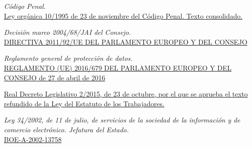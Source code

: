 \documentclass[10pt,a4paper]{article}
\begin{document}
\newpage

\begin{thebibliography}{9}
  \textit{Código Penal.}\\
  \href{https://www.boe.es/buscar/pdf/1995/BOE-A-1995-25444-consolidado.pdf}{Ley orgánica 10/1995 de 23 de noviembre del Código Penal. Texto consolidado.}

\textit{Decisión marco 2004/68/JAI del Consejo.}\\
\href{https://www.boe.es/doue/2011/335/L00001-00014.pdf}{DIRECTIVA 2011/92/UE DEL PARLAMENTO EUROPEO Y DEL CONSEJO}

\textit{Reglamento general de protección de datos.}\\
\href{https://www.boe.es/doue/2016/119/L00001-00088.pdf}{REGLAMENTO (UE) 2016/679 DEL PARLAMENTO EUROPEO Y DEL CONSEJO de 27 de abril de 2016}

\href{https://www.boe.es/eli/es/rdlg/2015/10/23/2/con}{Real Decreto Legislativo 2/2015, de 23 de octubre, por el que se aprueba el texto refundido de la Ley del Estatuto de los Trabajadores.}

\textit{Ley 34/2002, de 11 de julio, de servicios de la sociedad de la información y de comercio
electrónico. Jefatura del Estado.}\\
\href{https://www.boe.es/eli/es/l/2002/07/11/34/con}{BOE-A-2002-13758}

\end{thebibliography}
\end{document}
